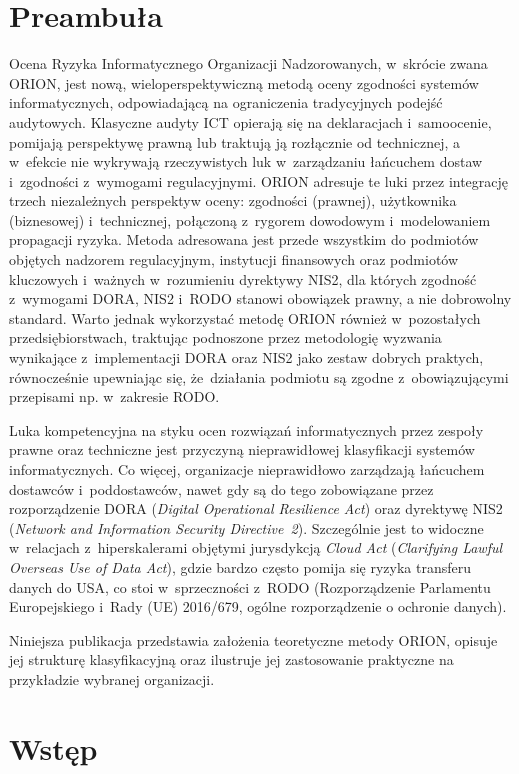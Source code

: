 \chapter{Preambuła}

Ocena Ryzyka Informatycznego Organizacji Nadzorowanych, w~skrócie zwana ORION, jest nową, wieloperspektywiczną metodą oceny zgodności systemów informatycznych, odpowiadającą na ograniczenia tradycyjnych podejść audytowych. Klasyczne audyty ICT opierają się na deklaracjach i~samoocenie, pomijają perspektywę prawną lub traktują ją rozłącznie od technicznej, a w~efekcie nie wykrywają rzeczywistych luk w~zarządzaniu łańcuchem dostaw i~zgodności z~wymogami regulacyjnymi. ORION adresuje te luki przez integrację trzech niezależnych perspektyw oceny: zgodności (prawnej), użytkownika (biznesowej) i~technicznej, połączoną z~rygorem dowodowym i~modelowaniem propagacji ryzyka.
Metoda adresowana jest przede wszystkim do podmiotów objętych nadzorem regulacyjnym, instytucji finansowych oraz podmiotów kluczowych i~ważnych w~rozumieniu dyrektywy NIS2, dla których zgodność z~wymogami DORA, NIS2 i~RODO stanowi obowiązek prawny, a nie dobrowolny standard. Warto jednak wykorzystać metodę ORION również w~pozostałych przedsiębiorstwach, traktując podnoszone przez metodologię wyzwania wynikające z~implementacji DORA oraz NIS2 jako zestaw dobrych praktych, równocześnie upewniając się, że~działania podmiotu są zgodne z~obowiązującymi przepisami np. w~zakresie RODO.

Luka kompetencyjna na styku ocen rozwiązań informatycznych przez zespoły prawne oraz techniczne jest przyczyną nieprawidłowej klasyfikacji systemów informatycznych. 
Co więcej, organizacje nieprawidłowo zarządzają łańcuchem dostawców i~poddostawców, nawet gdy są do tego zobowiązane przez rozporządzenie DORA (\textit{Digital Operational Resilience Act}) oraz dyrektywę NIS2 (\textit{Network and Information Security Directive~2}). Szczególnie jest to widoczne w~relacjach z~hiperskalerami objętymi jurysdykcją \textit{Cloud Act} (\textit{Clarifying Lawful Overseas Use of Data Act}), gdzie bardzo często pomija się ryzyka transferu danych do USA, co stoi w~sprzeczności z~RODO (Rozporządzenie Parlamentu Europejskiego i~Rady (UE) 2016/679, ogólne rozporządzenie o ochronie danych).

Niniejsza publikacja przedstawia założenia teoretyczne metody ORION, opisuje jej strukturę klasyfikacyjną oraz ilustruje jej zastosowanie praktyczne na przykładzie wybranej organizacji.

\chapter{Wstęp}


